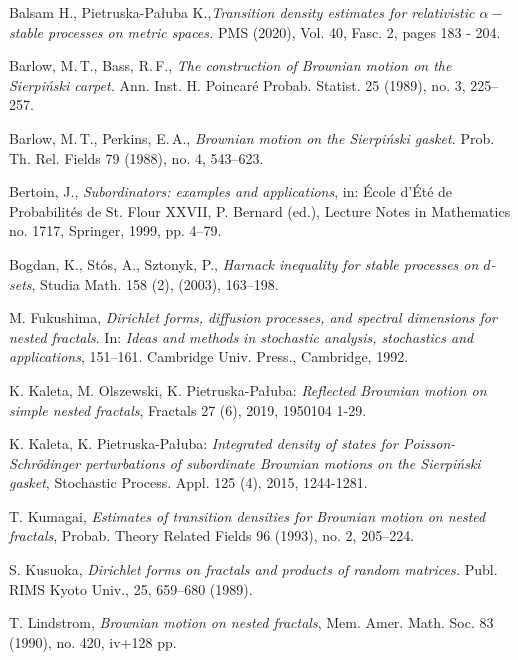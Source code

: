 \documentclass[11pt]{article}
\begin{document}
\newpage
\begin{thebibliography}{99}

Balsam H., Pietruska-Pa\l uba K.,{\em Transition density estimates for relativistic $\alpha-$stable processes on
metric spaces.} PMS (2020), Vol. 40, Fasc. 2, pages 183 - 204.

  Barlow, M.\,T., Bass, R.\,F., {\em The construction of Brownian motion on the Sierpi\'{n}ski carpet.} Ann. Inst. H. Poincar\'{e} Probab. Statist. 25 (1989), no. 3, 225--257.

 Barlow, M.\,T., Perkins, E.\,A., {\em Brownian motion on the Sierpi\'{n}ski gasket.} Prob. Th. Rel. Fields 79 (1988), no. 4, 543--623.

Bertoin, J.,
\emph{Subordinators: examples and applications}, in: \'Ecole d'\'Et\'e de Probabilit\'es de St. Flour XXVII,
P. Bernard (ed.), Lecture Notes in Mathematics no. 1717, Springer, 1999, pp. 4--79.

Bogdan, K.,  St\'os, A.,   Sztonyk, P.,
\emph{Harnack inequality for stable processes on $d$-sets},
Studia Math. 158 (2), (2003), 163--198.

 M. Fukushima, {\em Dirichlet forms, diffusion processes, and spectral dimensions
for nested fractals}. In: {\em Ideas and methods in stochastic analysis, stochastics and applications}, 151--161. Cambridge Univ. Press., Cambridge, 1992.

K. Kaleta, M. Olszewski, K. Pietruska-Pa\l uba:
\emph{Reflected Brownian motion on simple nested fractals}, Fractals 27 (6), 2019, 1950104 1-29.

K. Kaleta, K. Pietruska-Pa\l uba:
\emph{Integrated density of states for Poisson-Schr\"odinger perturbations of subordinate Brownian motions on the Sierpi\'nski gasket}, Stochastic Process. Appl. 125 (4), 2015, 1244-1281.

  T. Kumagai, {\em Estimates of transition densities for Brownian motion on nested fractals}, Probab. Theory Related Fields 96 (1993), no. 2, 205--224.

 S. Kusuoka, {\em Dirichlet forms on fractals and products of random matrices.}
Publ. RIMS Kyoto Univ., 25, 659--680 (1989).

  T. Lindstrom, {\em  Brownian motion on nested fractals},  Mem. Amer. Math. Soc. 83 (1990), no. 420, iv+128 pp.


\end{thebibliography}
\end{document}
